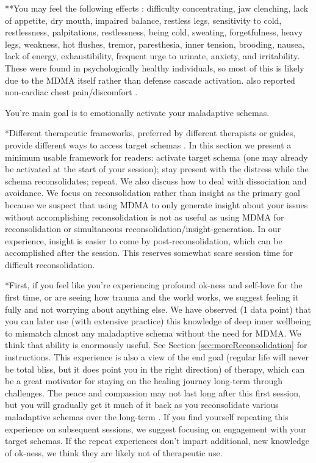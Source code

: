 \documentclass[12pt,letterpaper]{book}
\begin{document}
**You may feel the following effects \cite{liechtiGender}: difficulty concentrating, jaw clenching, lack of appetite, dry mouth, impaired balance, restless legs, sensitivity to cold, restlessness, palpitations, restlessness, being cold, sweating, forgetfulness, heavy legs, weakness, hot flushes, tremor, paresthesia, inner tension, brooding, nausea, lack of energy, exhaustibility, frequent urge to urinate, anxiety, and irritability. These were found in psychologically healthy individuals, so most of this is likely due to the MDMA itself rather than defense cascade activation. \textcite{colcott2024side} also reported non-cardiac chest pain/discomfort .

You're main goal is to emotionally activate your maladaptive schemas.

*Different therapeutic frameworks, preferred by different therapists or guides, provide different ways to access target schemas \cite{eckerUnlocking}. In this section we present a minimum usable framework for readers: activate target schema (one may already be activated at the start of your session); stay present with the distress while the schema reconsolidates; repeat. We also discuss how to deal with dissociation and avoidance. We focus on reconsolidation rather than insight as the primary goal because we suspect that using MDMA to only generate insight about your issues without accomplishing reconsolidation is not as useful as using MDMA for reconsolidation or simultaneous reconsolidation/insight-generation. In our experience, insight is easier to come by post-reconsolidation, which can be accomplished after the session. This reserves somewhat scare session time for difficult reconsolidation.

*First, if you feel like you're experiencing profound ok-ness and self-love for the first time, or are seeing how trauma and the world works, we suggest feeling it fully and not worrying about anything else. We have observed (1 data point) that you can later use (with extensive practice) this knowledge of deep inner wellbeing to mismatch almost any maladaptive schema without the need for MDMA. We think that ability is enormously useful. See Section \ref{sec:moreReconsolidation} for instructions. This experience is also a view of the end goal (regular life will never be total bliss, but it does point you in the right direction) of therapy, which can be a great motivator for staying on the healing journey long-term through challenges. The peace and compassion may not last long after this first session, but you will gradually get it much of it back as you reconsolidate various maladaptive schemas over the long-term \cite{evansAfterglow}. If you find yourself repeating this experience on subsequent sessions, we suggest focusing on engagement with your target schemas. If the repeat experiences don't impart additional, new knowledge of ok-ness, we think they are likely not of therapeutic use.
\end{document}
